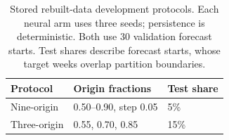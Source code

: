 \begin{table}[!ht]
\centering\small
\caption{Stored rebuilt-data development protocols. Each neural arm uses three seeds; persistence is deterministic. Both use 30 validation forecast starts. Test shares describe forecast starts, whose target weeks overlap partition boundaries.}
\label{tab:protocols}
\begin{tabular}{@{}lll@{}}\toprule
Protocol & Origin fractions & Test share \\\midrule
Nine-origin & 0.50--0.90, step 0.05 & 5\% \\
Three-origin & 0.55, 0.70, 0.85 & 15\% \\
\bottomrule\end{tabular}\end{table}
